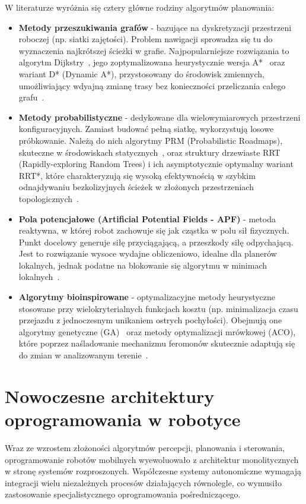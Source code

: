 \documentclass[a4paper,twoside,12pt]{book}
\begin{document}
W literaturze wyróżnia się cztery główne rodziny algorytmów planowania:
\begin{itemize}
    \item \textbf{Metody przeszukiwania grafów} - bazujące na dyskretyzacji przestrzeni roboczej (np. siatki zajętości). Problem nawigacji sprowadza się tu do wyznaczenia najkrótszej ścieżki w grafie. Najpopularniejsze rozwiązania to algorytm Dijkstry~\cite{javid_article}, jego zoptymalizowana heurystycznie wersja A*~\cite{astar_article} oraz wariant D* (Dynamic A*), przystosowany do środowisk zmiennych, umożliwiający wdyajną zmianę trasy bez konieczności przeliczania całego grafu~\cite{SARANYA2016178}.
    \item \textbf{Metody probabilistyczne} - dedykowane dla wielowymiarowych przestrzeni konfiguracyjnych. Zamiast budować pełną siatkę, wykorzystują losowe próbkowanie. Należą do nich algorytmy PRM (Probabilistic Roadmaps), skuteczne w środowiskach statycznych~\cite{prm_article}, oraz struktury drzewiaste RRT (Rapidly-exploring Random Trees) i ich asymptotycznie optymalny wariant RRT*, które charakteryzują się wysoką efektywnością w szybkim odnajdywaniu bezkolizyjnych ścieżek w złożonych przestrzeniach topologicznych~\cite{rrt_article, rrtstar_article}.
    \item \textbf{Pola potencjałowe (Artificial Potential Fields - APF)} - metoda reaktywna, w której robot zachowuje się jak cząstka w polu sił fizycznych. Punkt docelowy generuje siłę przyciągającą, a przeszkody siłę odpychającą. Jest to rozwiązanie wysoce wydajne obliczeniowo, idealne dla planerów lokalnych, jednak podatne na blokowanie się algorytmu w minimach lokalnych~\cite{apf_article}.
    \item \textbf{Algorytmy bioinspirowane} - optymalizacyjne metody heurystyczne stosowane przy wielokryterialnych funkcjach kosztu (np. minimalizacja czasu przejazdu z jednoczesnym unikaniem ostrych pochyłości). Obejmują one algorytmy genetyczne (GA)~\cite{GUO2019106467, GRIFFITHS1997485} oraz metody optymalizacji mrówkowej (ACO), które poprzez naśladowanie mechanizmu feromonów skutecznie adaptują się do zmian w analizowanym terenie~\cite{app14209511}.
\end{itemize}
\section{Nowoczesne architektury oprogramowania w robotyce}
Wraz ze wzrostem złożoności algorytmów percepcji, planowania i sterowania, oprogramowanie robotów mobilnych wyewoluowało z architektur monolitycznych w stronę systemów rozproszonych. Współczesne systemy autonomiczne wymagają integracji wielu niezależnych procesów działających równolegle, co wymusiło zastosowanie specjalistycznego oprogramowania pośredniczącego.
\end{document}
